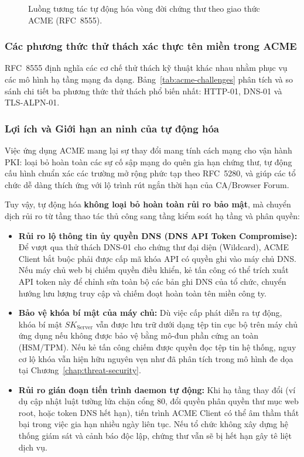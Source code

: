 \begin{figure}[!htbp]
\centering

\caption{Luồng tương tác tự động hóa vòng đời chứng thư theo giao thức ACME (RFC~8555).}
\label{fig:acme-workflow}
\end{figure}

\subsubsection{Các phương thức thử thách xác thực tên miền trong ACME}
RFC~8555 định nghĩa các cơ chế thử thách kỹ thuật khác nhau nhằm phục vụ các mô hình hạ tầng mạng đa dạng. Bảng~\ref{tab:acme-challenges} phân tích và so sánh chi tiết ba phương thức thử thách phổ biến nhất: HTTP-01, DNS-01 và TLS-ALPN-01.



\subsubsection{Lợi ích và Giới hạn an ninh của tự động hóa}
Việc ứng dụng ACME mang lại sự thay đổi mang tính cách mạng cho vận hành PKI: loại bỏ hoàn toàn các sự cố sập mạng do quên gia hạn chứng thư, tự động cấu hình chuẩn xác các trường mở rộng phức tạp theo RFC~5280, và giúp các tổ chức dễ dàng thích ứng với lộ trình rút ngắn thời hạn của CA/Browser Forum.

Tuy vậy, tự động hóa \textbf{không loại bỏ hoàn toàn rủi ro bảo mật}, mà chuyển dịch rủi ro từ tầng thao tác thủ công sang tầng kiểm soát hạ tầng và phân quyền:
\begin{itemize}
    \item \textbf{Rủi ro lộ thông tin ủy quyền DNS (DNS API Token Compromise):} Để vượt qua thử thách DNS-01 cho chứng thư đại diện (Wildcard), ACME Client bắt buộc phải được cấp mã khóa API có quyền ghi vào máy chủ DNS. Nếu máy chủ web bị chiếm quyền điều khiển, kẻ tấn công có thể trích xuất API token này để chỉnh sửa toàn bộ các bản ghi DNS của tổ chức, chuyển hướng lưu lượng truy cập và chiếm đoạt hoàn toàn tên miền công ty.
    \item \textbf{Bảo vệ khóa bí mật của máy chủ:} Dù việc cấp phát diễn ra tự động, khóa bí mật $SK_{\mathrm{Server}}$ vẫn được lưu trữ dưới dạng tệp tin cục bộ trên máy chủ ứng dụng nếu không được bảo vệ bằng mô-đun phần cứng an toàn (HSM/TPM). Nếu kẻ tấn công chiếm được quyền đọc tệp tin hệ thống, nguy cơ lộ khóa vẫn hiện hữu nguyên vẹn như đã phân tích trong mô hình đe dọa tại Chương~\ref{chap:threat-security}.
    \item \textbf{Rủi ro gián đoạn tiến trình daemon tự động:} Khi hạ tầng thay đổi (ví dụ cập nhật luật tường lửa chặn cổng 80, đổi quyền phân quyền thư mục web root, hoặc token DNS hết hạn), tiến trình ACME Client có thể âm thầm thất bại trong việc gia hạn nhiều ngày liên tục. Nếu tổ chức không xây dựng hệ thống giám sát và cảnh báo độc lập, chứng thư vẫn sẽ bị hết hạn gây tê liệt dịch vụ.
\end{itemize}

